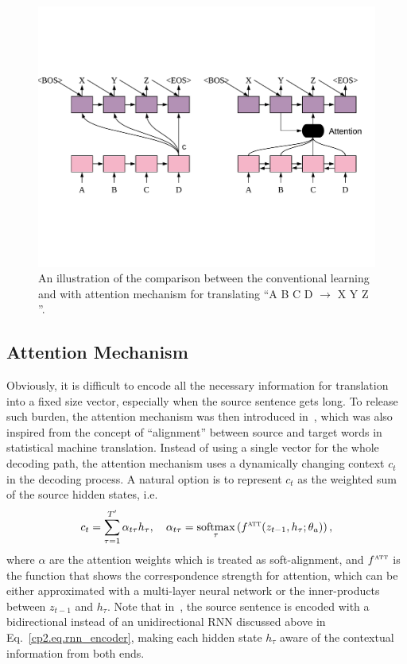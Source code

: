 \begin{figure}
    \centering
    \includegraphics[width=\textwidth]{figs/background/s2s_att.pdf}
    \caption{An illustration of the comparison between the conventional \sts learning and \sts with attention mechanism for translating ``A B C D $\rightarrow$ X Y Z ''.}
    \label{cp2.fig.comparison}
\end{figure}

\subsection{Attention Mechanism}
Obviously, it is difficult to encode all the necessary information for translation into a fixed size vector, especially when the source sentence gets long. 
To release such burden, the attention mechanism was then introduced in~, which was also inspired from the concept of ``alignment'' between source and target words in statistical machine translation. Instead of using a single vector for the whole decoding path, the attention mechanism uses a dynamically changing context $c_t$ in the decoding process. A natural option is to represent $c_t$ as the weighted sum of the source hidden states, i.e.
\begin{equation} 
    \label{cp2.eq.att}
	c_t = \sum_{\tau=1}^{T'}{\alpha_{t\tau} h_{\tau}}, \quad \alpha_{t\tau} =  \mathop{\operatorname{\text{softmax}}}\limits_\tau\left(f^{\textsc{att}}(z_{t-1}, h_{\tau}; \theta_a)\right),
\end{equation}
where $\alpha$ are the attention weights which is treated as soft-alignment, and $f^{\textsc{att}}$ is the function that shows the correspondence strength for attention, which can be either approximated with a multi-layer neural network or the inner-products between $z_{t-1}$ and $h_\tau$. 
Note that in~, the source sentence is encoded with a bidirectional instead of an unidirectional RNN discussed above in Eq.~\ref{cp2.eq.rnn_encoder}, making each hidden state $h_{\tau}$ aware of the contextual information from both ends. 


